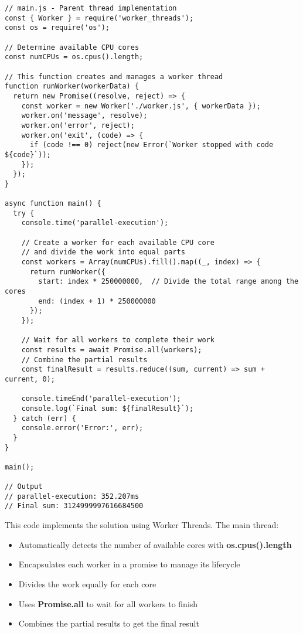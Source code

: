 \documentclass[12pt,letterpaper]{article}
\newenvironment{macterminal}{%
    \begin{mdframed}[
        linecolor=terminalFrame,
        backgroundcolor=terminalBg,
        roundcorner=5pt,
        skipabove=5pt,
        skipbelow=5pt,
        linewidth=1pt,
        innertopmargin=5pt,
        frametitle={%
            \tikz[baseline=(current bounding box.east), outer sep=0pt]{
                \fill[red!80!black] (0,0) circle (5pt);
                \fill[yellow!80!black] (0.7,0) circle (5pt);
                \fill[green!70!black] (1.4,0) circle (5pt);
            }
        },
        frametitlealignment=\raggedright,
        frametitleaboveskip=8pt,
        frametitlebelowskip=0pt,
    ]
}{%
    \end{mdframed}%
}
\begin{document}
\begin{macterminal}
\begin{lstlisting}
// main.js - Parent thread implementation
const { Worker } = require('worker_threads');
const os = require('os');

// Determine available CPU cores
const numCPUs = os.cpus().length;

// This function creates and manages a worker thread
function runWorker(workerData) {
  return new Promise((resolve, reject) => {
    const worker = new Worker('./worker.js', { workerData });
    worker.on('message', resolve);
    worker.on('error', reject);
    worker.on('exit', (code) => {
      if (code !== 0) reject(new Error(`Worker stopped with code ${code}`));
    });
  });
}

async function main() {
  try {
    console.time('parallel-execution');
    
    // Create a worker for each available CPU core
    // and divide the work into equal parts
    const workers = Array(numCPUs).fill().map((_, index) => {
      return runWorker({
        start: index * 250000000,  // Divide the total range among the cores
        end: (index + 1) * 250000000
      });
    });
    
    // Wait for all workers to complete their work
    const results = await Promise.all(workers);
    // Combine the partial results
    const finalResult = results.reduce((sum, current) => sum + current, 0);
    
    console.timeEnd('parallel-execution');
    console.log(`Final sum: ${finalResult}`);
  } catch (err) {
    console.error('Error:', err);
  }
}

main();

// Output
// parallel-execution: 352.207ms
// Final sum: 3124999997616684500
\end{lstlisting}
\end{macterminal}

This code implements the solution using Worker Threads. The main thread:
\begin{itemize}
    \item Automatically detects the number of available cores with \textbf{\textcolor{accentColor}{os.cpus().length}}
    \item Encapsulates each worker in a promise to manage its lifecycle
    \item Divides the work equally for each core
    \item Uses \textbf{\textcolor{accentColor}{Promise.all}} to wait for all workers to finish
    \item Combines the partial results to get the final result
\end{itemize}
\end{document}
